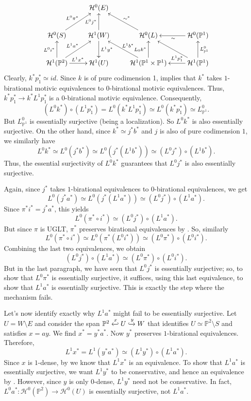 \[ \xymatrix{
  & \mathcal{H}^0(E) & & \\
  \mathcal{H}^0(S) \ar[ur]^{L^0\pi^*} & \mathcal{H}^1(W) \ar[d]^{L^1y^*}\ar[u]^{L^0j^*} & \mathcal{H}^0(L) \ar[ul]_{{\sim}^*} &\mathcal{H}^0(\mathbb{P}^1)\ar[l]^{{\sim}}  \\
  \mathcal{H}^1(\mathbb{P}^2) \ar[u]^{L^0i^*} \ar[ur]^{L^1a^*} \ar[r]^{L^1x^*}&\mathcal{H}^1(U) & \mathcal{H}^1(\mathbb{P}^1 \times \mathbb{P}^1) \ar[ul]_{L^1b^*} \ar[u]^{L_0k^*} & \mathcal{H}^1(\mathbb{P}^1)\ar[u]_{L^{0}_{\mathbb{P}^1}} \ar[ul]_{} \ar[l]_-{L^1p_1^*}
}\]
 Clearly, $k^*p_1^*\simeq id$. Since $k$ is of pure codimension 1,  implies that $k^*$ takes $1$-birational motivic equivalences to $0$-birational motivic equivalences. Thus, $k^*p_1^*\to k^*L^1p_1^*$ is a $0$-birational motivic equivalence. Consequently, $$(L^{0}k^*)\circ (L^1p_1^*)=L^0(k^*L^1p_1^*)\simeq L^{0}(k^*p_1^*)\simeq L^{0}_{\mathbb{P}^1}.$$ But $L_{\mathbb{P}^1}^0$ is essentially surjective (being a localization). So $L^0k^*$ is also essentially surjective. On the other hand, since $k^*\simeq j^*b^*$ and $j$ is also of pure codimension $1$, we similarly have $$L^0k^*\simeq L^0(j^*b^*)\simeq L^0(j^*( L^1b^*))\simeq (L^0j^*)\circ (L^1b^*).$$ Thus, the essential surjectivity of $L^0k^*$ guarantees that $L^0j^*$ is also essentially surjective.

Again, since $j^*$ takes $1$-birational equivalences to $0$-birational equivalences, we get $$L^0(j^*a^*)\simeq  L^0(j^*(L^1a^*))\simeq (L^0j^*)\circ (L^1a^*).$$ Since $\pi^*i^*=j^*a^*$, this yields $$L^0(\pi^*\circ i^*)\simeq (L^0j^*)\circ (L^1a^*).$$ But since $\pi$ is UGLT, $\pi^*$ preserves birational equivalences by . So, similarly $$L^0(\pi^*\circ i^*)\simeq L^0( \pi^*(L^0i^*))\simeq (L^0\pi^*)\circ (L^0i^*).$$ Combining the last two equivalences, we obtain $$(L^0j^*)\circ (L^1a^*)\simeq (L^0\pi^*)\circ (L^0i^*).$$ But in the last paragraph, we have seen that $L^0j^*$ is essentially surjective; so, to show that $L^0\pi^*$ is essentially surjective, it suffices, using this last equivalence, to show that $L^1a^*$ is essentially surjective. This is exactly the step where the mechanism fails.

Let's now identify exactly why $L^1a^*$ might fail to be essentially surjective. Let $U=W\setminus E$ and consider the span $\mathbb{P}^2\xhookleftarrow{x}U\xhookrightarrow{y}W$ that identifies $U\simeq \mathbb{P}^2\setminus S$ and satisfies $x=ay$. We find $x^*=y^*a^*$. Now $y^*$ preserves $1$-birational equivalences. Therefore, $$L^1x^*=L^1(y^*a^*)\simeq (L^1y^*)\circ (L^1a^*).$$ Since $x$ is $1$-dense, by  we know that $L^1x^*$ is an equivalence. To show that $L^1a^*$ is essentially surjective, we want $L^1y^*$ to be conservative, and hence an equivalence by . However, since $y$ is only $0$-dense, $L^1y^*$ need not be conservative. In fact, $L^0a^*:\mathcal{H}^0(\mathbb{P}^2)\to \mathcal{H}^0(U)$ is essentially surjective, not $L^1a^*$. 

